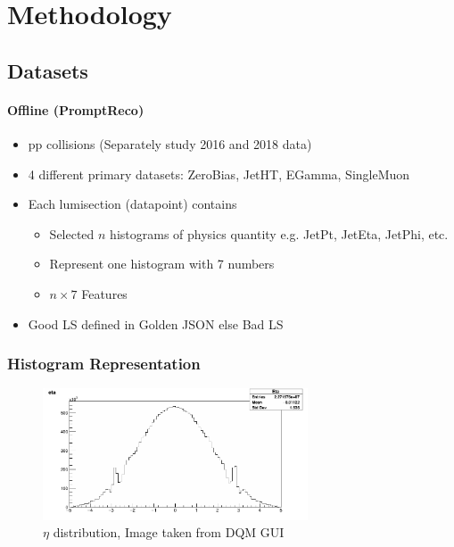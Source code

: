 \chapter{Methodology}

\section{Datasets}

\subsubsection{Offline (PromptReco)}
\begin{itemize}
    \item pp collisions (Separately study 2016 and 2018 data)
    \item 4 different primary datasets: ZeroBias, JetHT, EGamma, SingleMuon
    \item Each lumisection (datapoint) contains
    \begin{itemize}
        \item Selected $n$ histograms of physics quantity e.g. JetPt, JetEta, JetPhi, etc.
        \item Represent one histogram with 7 numbers
        \item $n \times 7$ Features
    \end{itemize}
    \item Good LS defined in Golden JSON else Bad LS
\end{itemize}

\subsection{Histogram Representation}
\begin{figure}[h!]
    \centering
    \includegraphics[width=0.7\textwidth]{images/ex_eta_dist.png}
    \caption{$\eta$ distribution, Image taken from DQM GUI}
    \label{fig:ex_eta_dist}
\end{figure}

